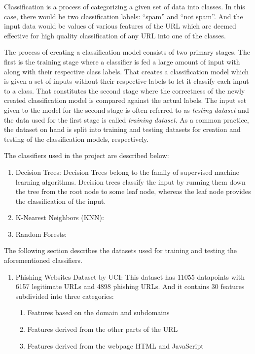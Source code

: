 \documentclass[conference]{IEEEtran}
\begin{document}
\par Classification is a process of categorizing a given set of data into classes.
In this case, there would be two classification labels: ``spam'' and ``not spam''.
And the input data would be values of various features of the URL which are deemed effective for high quality classification of any URL into one of the classes.


\par The process of creating a classification model consists of two primary stages.
The first is the training stage where a classifier is fed a large amount of input with along with their respective class labels.
That creates a classification model which is given a set of inputs without their respective labels to let it classify each input to a class.
That constitutes the second stage where the correctness of the newly created classification model is compared against the actual labels.
The input set given to the model for the second stage is often referred to as \emph{testing dataset} and the data used for the first stage is called \emph{training dataset}.
As a common practice, the dataset on hand is split into training and testing datasets for creation and testing of the classification models, respectively.

\par The classifiers used in the project are described below:
\begin{enumerate}
    \item Decision Trees:
          Decision Trees belong to the family of supervised machine learning algorithms.
          Decision trees classify the input by running them down the tree from the root node to some leaf node, whereas the leaf node provides the classification of the input.
    \item K-Nearest Neighbors (KNN):
    \item Random Forests:
\end{enumerate}

\par The following section describes the datasets used for training and testing the aforementioned classifiers.
\begin{enumerate}
    \item Phishing Websites Dataset by UCI\cite{UCIDataset}:
          This dataset has 11055 datapoints with 6157 legitimate URLs and 4898 phishing URLs.
          And it contains 30 features subdivided into three categories:
          \begin{enumerate}
            \item Features based on the domain and subdomains
            \item Features derived from the other parts of the URL
            \item Features derived from the webpage HTML and JavaScript
          \end{enumerate}
\end{enumerate}
\end{document}
